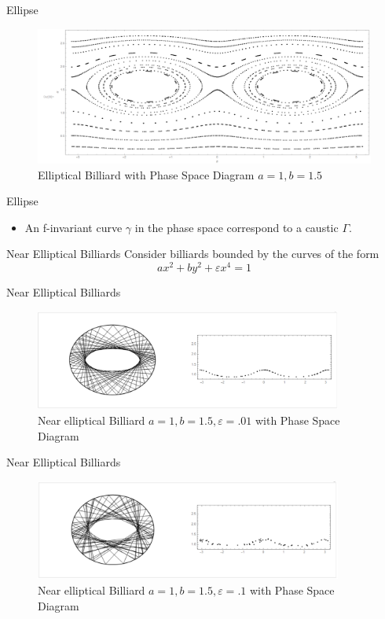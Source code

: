 \documentclass{beamer}
\begin{document}
\begin{frame}{Ellipse}
  \begin{figure}
    \centering
    \includegraphics[width = 1\textwidth]{EllipsePhaseSpace2}
    \caption{Elliptical Billiard with Phase Space Diagram $a = 1, b = 1.5$}
  \end{figure}
\end{frame}

\begin{frame}{Ellipse}
  \begin{itemize}
  \item
    An f-invariant curve $\gamma$ in the phase space correspond to a caustic $\Gamma$. 
  \end{itemize}
\end{frame}

\begin{frame}{Near Elliptical Billiards}
Consider billiards bounded by the curves of the form 
\[
    a x^2 + b y^2 + \varepsilon x^4 = 1
\]
\end{frame}

\begin{frame}{Near Elliptical Billiards}
  \begin{figure}
    \centering
    \includegraphics[width = 0.9\textwidth]{NearellipsePhaseSpace2}
    \caption{Near elliptical Billiard $a=1, b=1.5, \varepsilon = .01$ with Phase Space Diagram}
  \end{figure}
\end{frame}

\begin{frame}{Near Elliptical Billiards}
  \begin{figure}
    \centering
    \includegraphics[width = 0.9\textwidth]{NearellipsePhaseSpace3}
    \caption{Near elliptical Billiard $a=1, b=1.5, \varepsilon = .1$ with Phase Space Diagram}
  \end{figure}
\end{frame}
\end{document}
